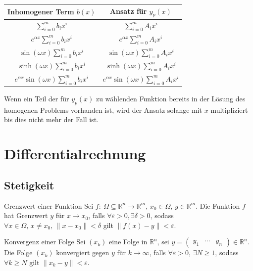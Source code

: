 \documentclass[a4paper,10pt]{article}
\def\R{\mathbb{R}}
\begin{document}
\begin{table}[H]
    \centering
    \footnotesize
    \begin{tabular}{|c|c|}
    \hline
    \textbf{Inhomogener Term $b(x)$} & \textbf{Ansatz für $y_p(x)$} \\ \hline
    $\sum_{i=0}^m b_ix^i$ & $\sum_{i=0}^m A_i x^i$ \\
    \hline
    $e^{\alpha x} \sum_{i=0}^m b_i x^i$ & $e^{\alpha x} \sum_{i=0}^m A_i x^i$ \\
    \hline
    $\sin(\omega x) \sum_{i=0}^m b_i x^i$ & $\sin(\omega x) \sum_{i=0}^m A_i x^i$ \\
    \hline
    $\sinh(\omega x) \sum_{i=0}^m b_i x^i$ & $\sinh(\omega x) \sum_{i=0}^m A_i x^i$ \\
    \hline
    $e^{\alpha x} \sin(\omega x) \sum_{i=0}^m b_i x^i$ & $e^{\alpha x} \sin(\omega x) \sum_{i=0}^m A_i x^i$ \\ \hline
    \end{tabular}
\end{table}

Wenn ein Teil der für \( y_p(x) \) zu wählenden Funktion bereits in der Lösung des homogenen Problems vorhanden ist, wird der Ansatz solange mit \( x \) multipliziert bis dies nicht mehr der Fall ist.


\section{Differentialrechnung}

\subsection{Stetigkeit}

\begin{mainbox}{Grenzwert einer Funktion}
    Sei \( f: \: \Omega \subseteq \R^n \to \R^m, \, x_0 \in \Omega, \, y \in \R^m \). Die Funktion \( f \) hat Grenzwert \( y \) für \( x \to x_0 \), falls \( \forall \varepsilon > 0, \exists \delta > 0 \), sodass \( \forall x \in \Omega, \, x \neq x_0, \, \| x - x_0 \| < \delta \) gilt \( \| f(x) - y \| < \varepsilon \).
\end{mainbox}

\begin{mainbox}{Konvergenz einer Folge}
    Sei \( \left( x_k \right) \) eine Folge in \( \R^n \), sei \( y = \begin{pmatrix}
        y_1 & \cdots & y_n
    \end{pmatrix} \in \R^n \). Die Folge \( \left( x_k \right) \) konvergiert gegen \( y \) für \( k \to \infty \), falls \( \forall \varepsilon > 0, \, \exists N \geq 1 \), sodass \( \forall k \geq N \) gilt \( \| x_k - y \| < \varepsilon\).
\end{mainbox}
\end{document}

